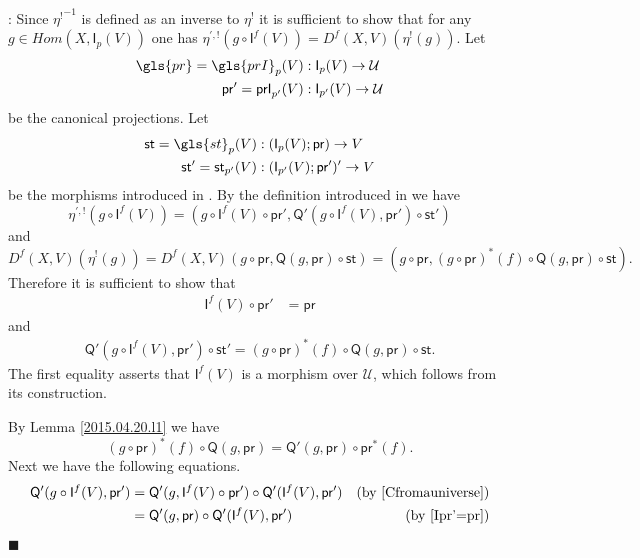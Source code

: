 \documentclass[12pt]{article}
\numberwithin{equation}{section}
\newenvironment{myproof}{{\bf Proof}:}{$\blacksquare$ \vskip 5mm }
\newcommand{\by}[1]{\text{(by #1)}}
\newcommand{\sr}{\rightarrow}
\newcommand{\U}{\mathcal{U}}
\newcommand{\I}{\mathsf{I}}
\newcommand{\Q}{\mathsf{Q}}
\newcommand{\etashriek}{\eta^!}
\newcommand{\etaunshriek}{{\etashriek}^{-1}}
\newcommand{\st}{\mathsf{st}}
\newcommand{\pr}{\mathsf{pr}}
\newcommand{\prI}{\mathsf{prI}}
\begin{document}
\begin{myproof}
Since $\etaunshriek$ is defined as an inverse to $\etashriek$ it is sufficient to show that
for any $g\in Hom(X,\I_p(V))$ one has $\eta^{',!}(g\circ
\I^f(V))=D^f(X,V)(\etashriek(g))$. Let
%
\begin{align*}
  \gls{pr}=\gls{prI}_p(V) & :\I_p(V)\sr \U \\
  \pr'=\prI_{p'}(V) & :\I_{p'}(V)\sr \U
\end{align*}
%
be the canonical projections. Let
%
\begin{align*}
  \st=\gls{st}_p(V)&:(\I_p(V);\pr)\sr V \\
  \st'=\st_{p'}(V)&:(\I_{p'}(V);\pr')'\sr V
\end{align*}
%
be the morphisms introduced in \cite[(2.60)]{presheavesOb}. By the definition introduced in \cite[(2.65)]{presheavesOb} we have
%
$$\eta^{',!}(g\circ \I^f(V))=(g\circ \I^f(V)\circ \pr', \Q'(g\circ \I^f(V), \pr')\circ \st')$$
%
and
%
$$D^f(X,V)(\etashriek(g))=D^f(X,V)(g\circ \pr, \Q(g,\pr)\circ \st)=(g\circ \pr, (g\circ \pr)^*(f)\circ \Q(g,\pr)\circ \st).$$
%
Therefore it is sufficient to show that
%
\begin{align}
  \I^f(V)\circ \pr' & =\pr \label{Ipr'=pr}
\end{align}
%
and
%
\begin{align}
   \Q'(g\circ \I^f(V), \pr')\circ \st'=(g\circ \pr)^*(f)\circ \Q(g,\pr)\circ \st.     \label{Q'stnat}
\end{align}
%
The first equality asserts that $\I^f(V)$ is a morphism over $\U$, which follows
from its construction.

By Lemma \ref{2015.04.20.l1} we have
%
\[(g\circ \pr)^*(f)\circ \Q(g,\pr)=\Q'(g,\pr)\circ \pr^*(f).\]
%
Next we have the following equations.
%
\begin{align*}
  \Q'(g\circ \I^f(V), \pr')
  & =\Q'(g,\I^f(V)\circ \pr')\circ \Q'(\I^f(V),\pr') & \by{\cite[Lemma 2.5]{Cfromauniverse}} \\
  & =\Q'(g,\pr)\circ \Q'(\I^f(V),\pr') & \by{\ref{Ipr'=pr}}
\end{align*}


\end{myproof}
\end{document}
